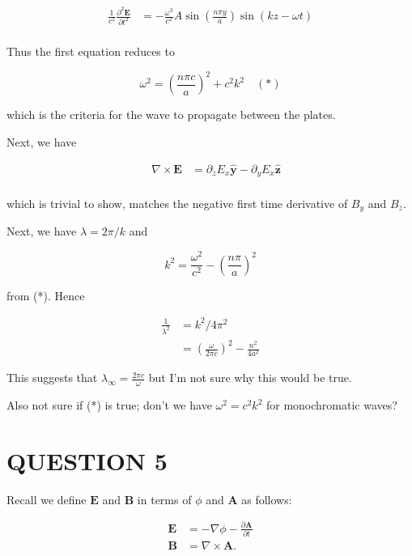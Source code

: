 \documentclass[a4paper]{article}
\begin{document}
\begin{align*}
\frac{1}{c^{2}} \frac{\partial^{2} \mathbf{E} }{\partial t^{2}} & = - \frac{\omega^{3}}{c^{2}} A \sin \left( \frac{n \pi y}{a} \right) \sin(kz - \omega t)  \\
\end{align*}

Thus the first equation reduces to

\[ \omega^{2} = \left(  \frac{n \pi c}{a} \right)^{2} + c^{2} k^{2}  \quad (*)\]

which is the criteria for the wave to propagate between the plates. 

Next, we have 

\begin{align*}
\quad \nabla \times \mathbf{E}  & =  \partial_{z} E_{x} \hat{\mathbf{y}}- \partial_{y} E_{x} \hat{\mathbf{z}}   \\
\end{align*}

which is trivial to show, matches the negative first time derivative of $ B_{y} $ and $ B_{z} $.

Next, we have $ \lambda = 2 \pi / k $ and

\[ k^{2} = \frac{\omega^{2}}{c^{2}} -  \left(  \frac{n \pi}{a} \right)^{2}   \]

from (*). Hence

\begin{align*}
 \frac{1}{\lambda^{2}} & = k^{2} / 4 \pi^{2}  \\
& = \left(  \frac{\omega}{2 \pi c} \right)^{2} - \frac{n^{2}}{4 a^{2}} 
\end{align*}

This suggests that $ \lambda_{\infty} = \frac{2 \pi c}{\omega} $ but I'm not sure why this would be true.

Also not sure if (*) is true; don't we have $ \omega^{2} = c^{2} k^2 $ for monochromatic waves?


\section{QUESTION 5}


Recall we define $\mathbf{E}$ and $\mathbf{B}$ in terms of $\phi$ and $\mathbf{A}$ as follows:

\begin{align*}
\mathbf{E} &= -\nabla\phi - \frac{\partial \mathbf{A}}{\partial t}\\
\mathbf{B} &= \nabla\times \mathbf{A}.
\end{align*}
\end{document}
